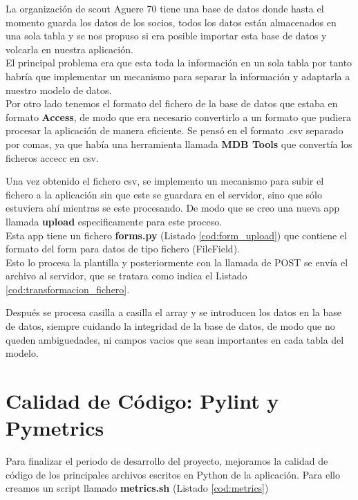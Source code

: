 La organización de scout Aguere 70 tiene una base de datos donde hasta el momento guarda los datos de los socios, todos los datos están almacenados en una sola tabla y se nos propuso si era posible importar esta base de datos
y volcarla en nuestra aplicación.\\

El principal problema era que esta toda la información en un sola tabla por tanto habría que implementar un mecanismo para separar la información y adaptarla a nuestro modelo de datos.\\

Por otro lado tenemos el formato del fichero de la base de datos que estaba en formato \textbf{Access}, de modo que era necesario convertirlo a un formato que pudiera procesar la aplicación de manera eficiente. Se pensó 
en el formato .csv separado por comas, ya que había una herramienta llamada \textbf{MDB Tools} que convertía los ficheros accecc en csv.

Una vez obtenido el fichero csv, se implemento un mecanismo para subir el fichero a la aplicación sin que este se guardara en el servidor, sino que sólo estuviera ahí mientras se este procesando. De modo que se creo 
una nueva app llamada \textbf{upload} especificamente para este proceso.\\

Esta app tiene un fichero \textbf{forms.py} (Listado \ref{cod:form_upload}) que contiene el formato del form para datos de tipo fichero (FileField).\\


\bigskip
Esto lo procesa la plantilla y posteriormente con la llamada de POST se envía el archivo al servidor, que se tratara como indica el Listado \ref{cod:transformacion_fichero}.
\bigskip


Después se procesa casilla a casilla el array y se introducen los datos en la base de datos, siempre cuidando la integridad de la base de datos, de modo que no queden ambiguedades, ni campos vacios que sean importantes 
en cada tabla del modelo.\\

\section{Calidad de Código: Pylint y Pymetrics}
\label{4:sec12}
Para finalizar el periodo de desarrollo del proyecto, mejoramos la calidad de código de los principales archivos escritos en Python de la aplicación. 
Para ello creamos un script llamado \textbf{metrics.sh} (Listado \ref{cod:metrics})

